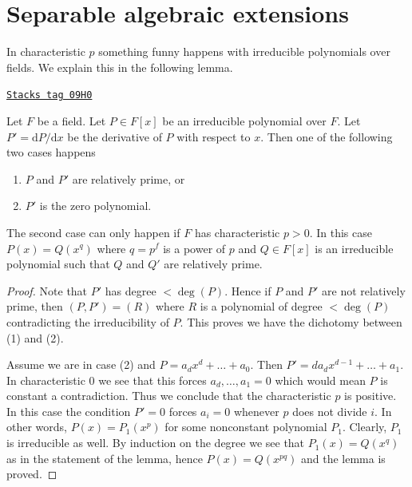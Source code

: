 \section{Separable algebraic extensions}
\label{fields-section-separable-extensions}
In characteristic $p$ something funny happens with irreducible polynomials
over fields. We explain this in the following lemma.

\begin{lemma}
\label{fields-lemma-irreducible-polynomials}
\href{https://stacks.math.columbia.edu/tag/09H0}{\texttt{Stacks tag 09H0}}

Let $F$ be a field. Let $P \in F[x]$ be an irreducible polynomial over $F$.
Let $P' = \text{d}P/\text{d}x$ be the derivative of $P$ with respect
to $x$. Then one of the following two cases happens
\begin{enumerate}
\item $P$ and $P'$ are relatively prime, or
\item $P'$ is the zero polynomial.
\end{enumerate}
The second case can only happen if $F$ has characteristic $p > 0$.
In this case $P(x) = Q(x^q)$ where $q = p^f$ is a power of $p$ and
$Q \in F[x]$ is an irreducible polynomial such that $Q$ and $Q'$
are relatively prime.
\end{lemma}

\begin{proof}
Note that $P'$ has degree $< \deg(P)$. Hence if $P$ and $P'$ are not relatively
prime, then $(P, P') = (R)$ where $R$ is a polynomial of degree $< \deg(P)$
contradicting the irreducibility of $P$. This proves we have the dichotomy
between (1) and (2).

\medskip\noindent
Assume we are in case (2) and $P = a_d x^d + \ldots + a_0$. Then
$P' = da_d x^{d - 1} + \ldots + a_1$. In characteristic $0$ we see
that this forces $a_d, \ldots, a_1 = 0$ which would mean $P$ is constant
a contradiction. Thus we conclude that the characteristic $p$ is positive.
In this case the condition $P' = 0$ forces $a_i = 0$ whenever $p$ does
not divide $i$.
In other words, $P(x) = P_1(x^p)$ for some nonconstant polynomial $P_1$.
Clearly, $P_1$ is irreducible as well. By induction on the degree we
see that $P_1(x) = Q(x^q)$ as in the statement of the lemma, hence
$P(x) = Q(x^{pq})$ and the lemma is proved.
\end{proof}

